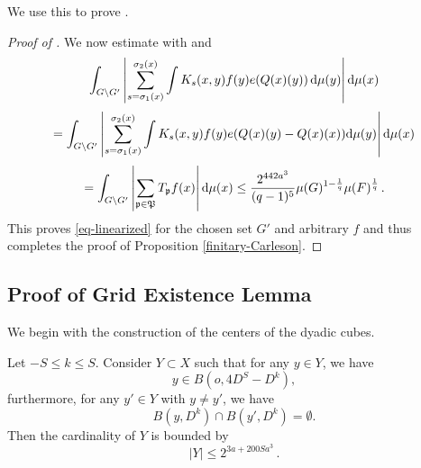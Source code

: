 We use this to prove .
\begin{proof}[Proof of ]
\leanok
We now estimate with  and 
\begin{equation}
 \int_{G \setminus G'} \left|\sum_{s={\sigma_1}(x)}^{{\sigma_2}(x)} \int K_s(x,y) f(y) e({Q}(x)(y)) \, \mathrm{d}\mu(y)\right| \mathrm{d}\mu(x)
\end{equation}
\begin{equation}
 =\int_{G \setminus G'} \left|\sum_{s={\sigma_1}(x)}^{{\sigma_2}(x)} \int K_s(x,y) f(y) e({Q}(x)(y) - {Q}(x)(x))\mathrm{d}\mu(y)\right| \mathrm{d}\mu(x)
\end{equation}
\begin{equation}
 =\int_{G \setminus G'} \left|\sum_{{\mathfrak p}\in {\mathfrak P}}T_{{\mathfrak p}} f(x)\right| \mathrm{d}\mu(x)
 \le \frac{2^{442a^3}}{(q-1)^5} \mu(G)^{1 - \frac{1}{q}} \mu(F)^{\frac{1}{q}} \,.
\end{equation}
This proves \eqref{eq-linearized} for the chosen set $G'$ and arbitrary $f$ and thus completes the proof of Proposition
\ref{finitary-Carleson}.
\end{proof}


\subsection{Proof of Grid Existence Lemma}
\label{subsecdyadic}

We begin with the construction of the centers of the dyadic cubes.
\begin{lemma}
    \label{counting-balls}
    \leanok
    Let $-S\le k\le S$. Consider $Y\subset X$ such that for any $y\in Y$, we have
    \begin{equation}\label{ybinb}
    y\in B(o,4D^S-D^k),
    \end{equation}
    furthermore, for any $y'\in Y$ with $y\neq y'$, we have
    \begin{equation} \label{eq-disj-yballs}
        B(y,D^k)\cap B(y',D^k)=\emptyset.
    \end{equation}
    Then the cardinality of $Y$ is bounded by
    \begin{equation}\label{boundY}
        |Y|\le 2^{3a + 200Sa^3}\, .
    \end{equation}
\end{lemma}


